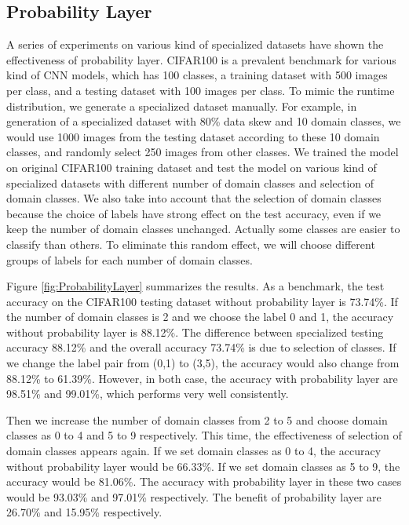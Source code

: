 \documentclass[conference]{IEEEtran}
\begin{document}
\begin{spacing}{0.9}
\subsection{Probability Layer}
A series of experiments on various kind of specialized datasets have shown the effectiveness of probability layer. CIFAR100 is a prevalent benchmark for various kind of CNN models, which has 100 classes, a training dataset with 500 images per class, and a testing dataset with 100 images per class. To mimic the runtime distribution, we generate a specialized dataset manually. For example, in generation of a specialized dataset with 80\% data skew and 10 domain classes, we would use 1000 images from the testing dataset according to these 10 domain classes, and randomly select 250 images from other classes. We trained the model on original CIFAR100 training dataset and test the model on various kind of specialized datasets with different number of domain classes and selection of domain classes. We also take into account that the selection of domain classes because the choice of labels have strong effect on the test accuracy, even if we keep the number of domain classes unchanged. Actually some classes are easier to classify than others. To eliminate this random effect, we will choose different groups of labels for each number of domain classes.

Figure \ref{fig:ProbabilityLayer} summarizes the results. As a benchmark, the test accuracy on the CIFAR100 testing dataset without probability layer is 73.74\%. If the number of domain classes is 2 and we choose the label 0 and 1, the accuracy without probability layer is 88.12\%. The difference between specialized testing accuracy 88.12\% and the overall accuracy 73.74\% is due to selection of classes. If we change the label pair from (0,1) to (3,5), the accuracy would also change from 88.12\% to 61.39\%. However, in both case, the accuracy with probability layer are 98.51\% and 99.01\%, which performs very well consistently. 

Then we increase the number of domain classes from 2 to 5 and choose domain classes as 0 to 4 and 5 to 9 respectively. This time, the effectiveness of selection of domain classes appears again. If we set domain classes as 0 to 4, the accuracy without probability layer would be 66.33\%. If we set domain classes as 5 to 9, the accuracy would be 81.06\%. The accuracy with probability layer in these two cases would be 93.03\% and 97.01\% respectively. The benefit of probability layer are 26.70\% and 15.95\% respectively.


\end{spacing}
\end{document}
